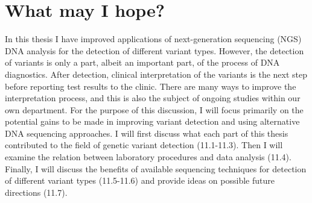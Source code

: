 \chapter[What may I hope?]{What may I hope? }
\label{chap:discussion}

{ \Large {} }


\newpage


In this thesis I have improved applications of next-generation sequencing (NGS) DNA analysis for the detection of different variant types. 
However, the detection of variants is only a part, albeit an important part, of the process of DNA diagnostics. 
After detection, clinical interpretation of the variants is the next step before reporting test results to the clinic. 
There are many ways to improve the interpretation process, and this is also the subject of ongoing studies within our own department. 
For the purpose of this discussion, I will focus primarily on the potential gains to be made in improving variant detection and using alternative DNA sequencing approaches. 
I will first discuss what each part of this thesis contributed to the field of genetic variant detection (11.1-11.3).
Then I will examine the relation between laboratory procedures and data analysis (11.4). 
Finally, I will discuss the benefits of available sequencing techniques for detection of different variant types (11.5-11.6) and provide ideas on possible future directions (11.7).

